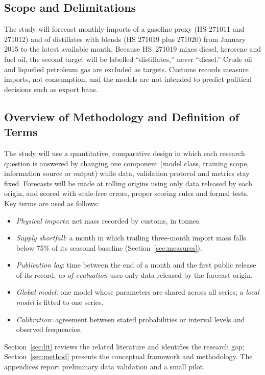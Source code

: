 \documentclass[conference]{IEEEtran}
\begin{document}
\subsection{Scope and Delimitations}
The study will forecast monthly imports of a gasoline proxy (HS 271011 and 271012) and of distillates with blends (HS 271019 plus 271020) from January 2015 to the latest available month. Because HS~271019 mixes diesel, kerosene and fuel oil, the second target will be labelled ``distillates,'' never ``diesel.'' Crude oil and liquefied petroleum gas are excluded as targets. Customs records measure imports, not consumption, and the models are not intended to predict political decisions such as export bans.

\subsection{Overview of Methodology and Definition of Terms}
The study will use a quantitative, comparative design in which each research question is answered by changing one component (model class, training scope, information source or output) while data, validation protocol and metrics stay fixed. Forecasts will be made at rolling origins using only data released by each origin, and scored with scale-free errors, proper scoring rules and formal tests. Key terms are used as follows:
\begin{itemize}
\item \emph{Physical imports}: net mass recorded by customs, in tonnes.
\item \emph{Supply shortfall}: a month in which trailing three-month import mass falls below 75\% of its seasonal baseline (Section~\ref{sec:measures}).
\item \emph{Publication lag}: time between the end of a month and the first public release of its record; \emph{as-of evaluation} uses only data released by the forecast origin.
\item \emph{Global model}: one model whose parameters are shared across all series; a \emph{local model} is fitted to one series.
\item \emph{Calibration}: agreement between stated probabilities or interval levels and observed frequencies.
\end{itemize}

Section~\ref{sec:lit} reviews the related literature and identifies the research gap; Section~\ref{sec:method} presents the conceptual framework and methodology. The appendices report preliminary data validation and a small pilot.
\end{document}
